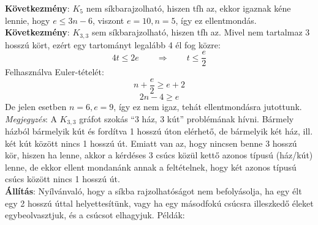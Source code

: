 \documentclass[a4paper,12pt,twoside]{book}
\theoremstyle{break}
\begin{document}
\textbf{Következmény}: $K_5$ nem síkbarajzolható, hiszen tfh az, ekkor igaznak kéne lennie, hogy $e \leqslant 3n-6$, viszont $e=10, n=5$, így ez ellentmondás.\\
\textbf{Következmény}: $K_{3,3}$ sem síkbarajzolható, hiszen tfh az. Mivel nem tartalmaz 3 hosszú kört, ezért egy tartományt legalább 4 él fog közre:
\[4t \leqslant 2e \qquad \Rightarrow \qquad t \leqslant \frac{e}{2}\]
Felhasználva Euler-tételét:
\[n+\frac{e}{2} \geqslant e+2\]
\[2n-4 \geqslant e\]
De jelen esetben $n=6, e=9$, így ez nem igaz, tehát ellentmondásra jutottunk.\\
\emph{Megjegyzés}: A $K_{3,3}$ gráfot szokás ``3 ház, 3 kút'' problémának hívni. Bármely házból bármelyik kút és fordítva 1 hosszú úton elérhető, de bármelyik két ház, ill. két kút között nincs 1 hosszú út. Emiatt van az, hogy nincsen benne 3 hosszú kör, hiszen ha lenne, akkor a kérdéses 3 csúcs közül kettő azonos típusú (ház/kút) lenne, de ekkor ellent mondanánk annak a feltételnek, hogy két azonos típusú csúcs között nincs 1 hosszú út.\\

\textbf{Állítás}: Nyílvánvaló, hogy a síkba rajzolhatóságot nem befolyásolja, ha egy élt egy 2 hosszú úttal helyettesítünk, vagy ha egy másodfokú csúcsra illeszkedő éleket egybeolvasztjuk, és a csúcsot elhagyjuk. Példák:
\begin{center}
\end{center}
\begin{center}
\end{center}
\end{document}
